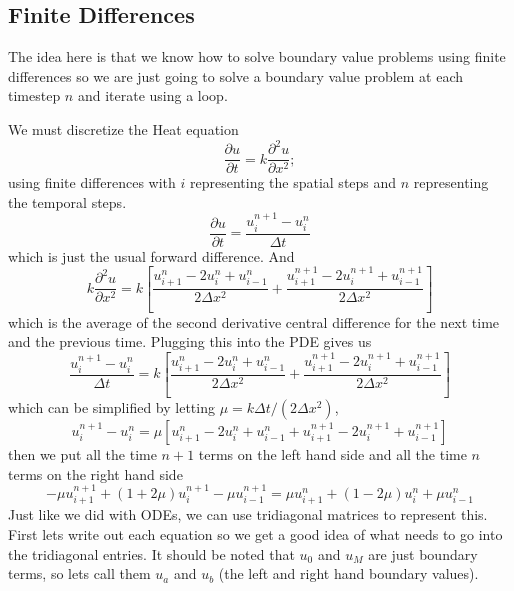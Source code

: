 \documentclass[reqno]{amsart}
\theoremstyle{definition}
\begin{document}
\pagebreak

\subsection*{Finite Differences}

The idea here is that we know how to solve boundary value problems using finite differences so we are just going to solve a boundary value problem at each timestep $n$ and iterate using a loop.

We must discretize the Heat equation 
%
\begin{equation*}
\frac{\partial u}{\partial t} = k\frac{\partial^2 u}{\partial x^2};
\end{equation*}
%
using finite differences with $i$ representing the spatial steps and $n$ representing the temporal steps.
%
\begin{equation*}
\frac{\partial u}{\partial t} = \frac{u_i^{n+1} - u_i^n}{\Delta t}
\end{equation*}
%
which is just the usual forward difference.  And
%
\begin{equation*}
k\frac{\partial^2 u}{\partial x^2} = k\left[\frac{u_{i+1}^n - 2u_i^n + u_{i-1}^n}{2\Delta x^2} + \frac{u_{i+1}^{n+1} - 2u_i^{n+1} + u_{i-1}^{n+1}}{2\Delta x^2}\right]
\end{equation*}
%
which is the average of the second derivative central difference for the next time and the previous time.  Plugging this into the PDE gives us
%
\begin{equation}
\frac{u_i^{n+1} - u_i^n}{\Delta t} = k\left[\frac{u_{i+1}^n - 2u_i^n + u_{i-1}^n}{2\Delta x^2} + \frac{u_{i+1}^{n+1} - 2u_i^{n+1} + u_{i-1}^{n+1}}{2\Delta x^2}\right]
\end{equation}
%
which can be simplified by letting $\mu = k\Delta t/(2\Delta x^2)$,
%
\begin{equation*}
u_i^{n+1} - u_i^n = \mu\left[u_{i+1}^n - 2u_i^n + u_{i-1}^n + u_{i+1}^{n+1} - 2u_i^{n+1} + u_{i-1}^{n+1}\right]
\end{equation*}
%
then we put all the time $n+1$ terms on the left hand side and all the time $n$ terms on the right hand side
%
\begin{equation*}
-\mu u_{i+1}^{n+1} + (1+2\mu)u_i^{n+1} - \mu u_{i-1}^{n+1} = \mu u_{i+1}^n + (1-2\mu)u_i^n + \mu u_{i-1}^n
\end{equation*}
%
Just like we did with ODEs, we can use tridiagonal matrices to represent this.  First lets write out each equation so we get a good idea of what needs to go into the tridiagonal entries.  It should be noted that $u_0$ and $u_M$ are just boundary terms, so lets call them $u_a$ and $u_b$ (the left and right hand boundary values).  
\end{document}
